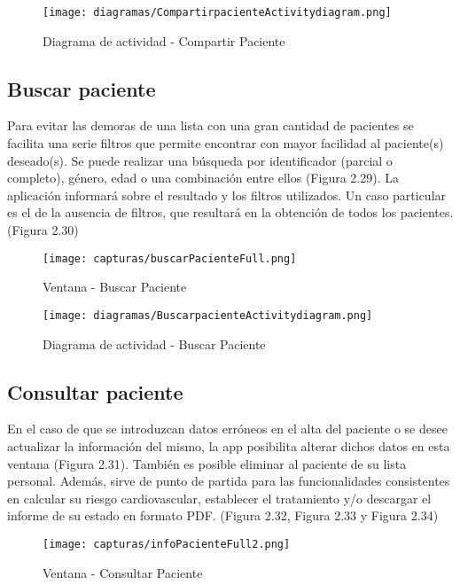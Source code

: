 \documentclass[11pt,spanish,
		listoftables,listoffigures]
		{tfgplantilla}
\begin{document}
\begin{figure}[H]
\centering
\texttt{[image: diagramas/CompartirpacienteActivitydiagram.png]}
\caption{Diagrama de actividad - Compartir Paciente}
\end{figure}

\newpage
\subsection {Buscar paciente}

Para evitar las demoras de una lista con una gran cantidad de pacientes se facilita una serie filtros que permite encontrar con mayor facilidad al paciente(s) deseado(s). Se puede realizar una búsqueda  por identificador (parcial o completo), género, edad o una combinación entre ellos (Figura 2.29). La aplicación informará sobre el resultado y los filtros utilizados. Un caso particular es el de la ausencia de filtros, que resultará en la obtención de todos los pacientes. (Figura 2.30)

\begin{figure}[H]
\centering
\texttt{[image: capturas/buscarPacienteFull.png]}
\caption{Ventana - Buscar Paciente}
\end{figure}

\newpage
\begin{figure}[H]
\centering
\texttt{[image: diagramas/BuscarpacienteActivitydiagram.png]}
\caption{Diagrama de actividad - Buscar Paciente}
\end{figure}

\newpage
\subsection {Consultar paciente}

En el caso de que se introduzcan datos erróneos en el alta del paciente o se desee actualizar la información del mismo, la app posibilita alterar dichos datos en esta ventana (Figura 2.31). También es posible eliminar al paciente de su lista personal. Además, sirve de punto de partida para las funcionalidades consistentes en calcular su riesgo cardiovascular, establecer el tratamiento y/o descargar el informe de su estado en formato PDF. (Figura 2.32, Figura 2.33 y Figura 2.34)

\begin{figure}[H]
\centering
\texttt{[image: capturas/infoPacienteFull2.png]}
\caption{Ventana - Consultar Paciente}
\end{figure}
\end{document}

